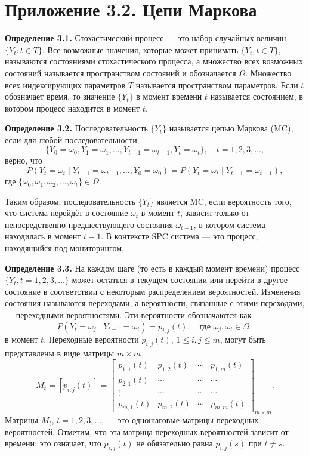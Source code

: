\section*{Приложение 3.2. Цепи Маркова}

\noindent\textbf{Определение 3.1.} Стохастический процесс — это набор случайных величин \(\{Y_t : t \in T\}\). Все возможные значения, которые может принимать \(\{Y_t, t \in T\}\), называются состояниями стохастического процесса, а множество всех возможных состояний называется пространством состояний и обозначается \(\Omega\). Множество всех индексирующих параметров \(T\) называется пространством параметров. Если \(t\) обозначает время, то значение \(\{Y_t\}\) в момент времени \(t\) называется состоянием, в котором процесс находится в момент \(t\).

\noindent\textbf{Определение 3.2.} Последовательность \(\{Y_t\}\) называется цепью Маркова (MC), если для любой последовательности
\[
	\{Y_0 = \omega_0, Y_1 = \omega_1, \ldots, Y_{t-1} = \omega_{t-1}, Y_t = \omega_t\}, \quad t = 1, 2, 3, \ldots,
\]
верно, что
\[
	P(Y_t = \omega_t \mid Y_{t-1} = \omega_{t-1}, \ldots, Y_0 = \omega_0) = P(Y_t = \omega_t \mid Y_{t-1} = \omega_{t-1}),
\]
где \(\{\omega_0, \omega_1, \omega_2, \ldots, \omega_t\} \in \Omega\).

Таким образом, последовательность \(\{Y_t\}\) является MC, если вероятность того, что система перейдёт в состояние \(\omega_t\) в момент \(t\), зависит только от непосредственно предшествующего состояния \(\omega_{t-1}\), в котором система находилась в момент \(t - 1\). В контексте SPC система — это процесс, находящийся под мониторингом.

\noindent\textbf{Определение 3.3.} На каждом шаге (то есть в каждый момент времени) процесс \(\{Y_t, t = 1, 2, 3, \ldots\}\) может остаться в текущем состоянии или перейти в другое состояние в соответствии с некоторым распределением вероятностей. Изменения состояния называются переходами, а вероятности, связанные с этими переходами, — переходными вероятностями. Эти вероятности обозначаются как
\[
	P(Y_t = \omega_j \mid Y_{t-1} = \omega_i) = p_{i,j}(t), \quad \text{где } \omega_j, \omega_i \in \Omega,
\]
в момент \(t\). Переходные вероятности \(p_{i,j}(t)\), \(1 \le i, j \le m\), могут быть представлены в виде матрицы \(m \times m\)
\[
	M_t = [p_{i,j}(t)] =
	\begin{bmatrix}
		p_{1,1}(t) & p_{1,2}(t) & \cdots & p_{1,m}(t) \\
		p_{2,1}(t) & \cdots     & \cdots & \cdots     \\
		\vdots     & \cdots     & \cdots & \cdots     \\
		p_{m,1}(t) & p_{m,2}(t) & \cdots & p_{m,m}(t)
	\end{bmatrix}_{m \times m}.
\]
Матрицы \(M_t\), \(t = 1, 2, 3, \ldots\), — это одношаговые матрицы переходных вероятностей. Отметим, что эта матрица переходных вероятностей зависит от времени; это означает, что \(p_{i,j}(t)\) не обязательно равна \(p_{i,j}(s)\) при \(t \ne s\).

